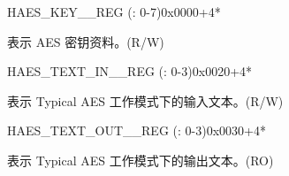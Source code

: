 \begin{register}{H}{AES\_KEY\_\_REG (: 0-7)}{0x0000+4*}\label{regdesc:AESKEYNREG}
%
\regnewline%
\begin{regdesc}\begin{reglist}
\item [AES\_KEY\_\regindex{n}\_REG (\regindex{n}: 0-7)] 表示 AES 密钥资料。(R/W)
\end{reglist}\end{regdesc}
\end{register}

\begin{register}{H}{AES\_TEXT\_IN\_\_REG (: 0-3)}{0x0020+4*}\label{regdesc:AESTEXTINNREG}
%
\regnewline%
\begin{regdesc}\begin{reglist}
\item [AES\_TEXT\_IN\_\regindex{m}\_REG (\regindex{m}: 0-3)] 表示 Typical AES 工作模式下的输入文本。(R/W)
\end{reglist}\end{regdesc}
\end{register}


\begin{register}{H}{AES\_TEXT\_OUT\_\_REG (: 0-3)}{0x0030+4*}\label{regdesc:AESTEXTOUTNREG}
%
\regnewline%
\begin{regdesc}\begin{reglist}
\item [AES\_TEXT\_OUT\_\regindex{m}\_REG (\regindex{m}: 0-3)] 表示 Typical AES 工作模式下的输出文本。(RO)
\end{reglist}\end{regdesc}
\end{register}


